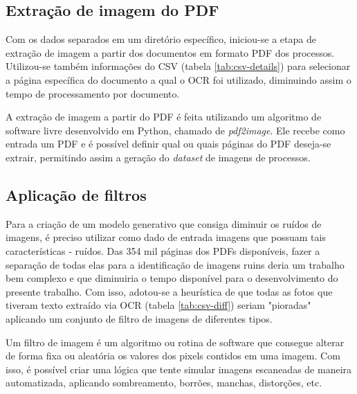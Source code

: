 \subsection{Extração de imagem do PDF}
Com os dados separados em um diretório específico, iniciou-se a etapa de extração de imagem a partir dos documentos em formato PDF dos processos. Utilizou-se também informações do CSV (tabela \ref{tab:csv-details}) para selecionar a página específica do documento a qual o OCR foi utilizado, diminuindo assim o tempo de processamento por documento.

A extração de imagem a partir do PDF é feita utilizando um algoritmo de software livre desenvolvido em Python, chamado de \textit{pdf2image}. Ele recebe como entrada um PDF e é possível definir qual ou quais páginas do PDF deseja-se extrair, permitindo assim a geração do \textit{dataset} de imagens de processos.

\subsection{Aplicação de filtros}
Para a criação de um modelo generativo que consiga diminuir os ruídos de imagens, é preciso utilizar como dado de entrada imagens que possuam tais características - ruídos. Das 354 mil páginas dos PDFs disponíveis, fazer a separação de todas elas para a identificação de imagens ruins deria um trabalho bem complexo e que diminuiria o tempo disponível para o desenvolvimento do presente trabalho. Com isso, adotou-se a heurística de que todas as fotos que tiveram texto extraído via OCR (tabela \ref{tab:csv-diff}) seriam "pioradas" aplicando um conjunto de filtro de imagens de diferentes tipos.

Um filtro de imagem é um algoritmo ou rotina de software que consegue alterar de forma fixa ou aleatória os valores dos pixels contidos em uma imagem. Com isso, é possível criar uma lógica que tente simular imagens escaneadas de maneira automatizada, aplicando sombreamento, borrões, manchas, distorções, etc.


